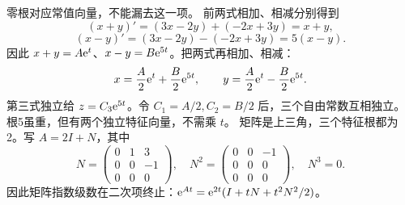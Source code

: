 零根对应常值向量，不能漏去这一项。
前两式相加、相减分别得到
\[
(x+y)'=(3x-2y)+(-2x+3y)=x+y,
\]
\[
(x-y)'=(3x-2y)-(-2x+3y)=5(x-y).
\]
因此 $x+y=A\mathrm e^t$、$x-y=B\mathrm e^{5t}$。把两式再相加、相减：
\[
x=\dfrac A2\mathrm e^t+\dfrac B2\mathrm e^{5t},\qquad
y=\dfrac A2\mathrm e^t-\dfrac B2\mathrm e^{5t}.
\]
第三式独立给 $z=C_3\mathrm e^{5t}$。令 $C_1=A/2,C_2=B/2$ 后，三个自由常数互相独立。
根5虽重，但有两个独立特征向量，不需乘 $t$。
矩阵是上三角，三个特征根都为2。写 $A=2I+N$，其中
\[
N=\begin{pmatrix}0&1&3\\0&0&-1\\0&0&0\end{pmatrix},\quad
N^2=\begin{pmatrix}0&0&-1\\0&0&0\\0&0&0\end{pmatrix},\quad N^3=0.
\]
因此矩阵指数级数在二次项终止：$\mathrm e^{At}=\mathrm e^{2t}(I+tN+t^2N^2/2)$。

